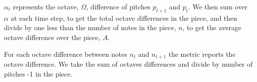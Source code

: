 \documentclass[11pt]{article}
\begin{document}
\indent $\alpha_t$ represents the octave, $\Omega$, difference of pitches $p_{t+1}$ and $p_t$. We then sum over $\alpha$ at each time step, to get the total octave differences in the piece, and then divide by one less than the number of notes in the piece, $n$, to get the average octave difference over the piece, $A$.

For each octave difference between notes $n_t$ and $n_{t+1}$ the metric reports the octave difference. We take the sum of octaves differences and divide by number of pitches -1 in the piece.








\nocite{huang2018music, kotecha2018generating, vaswani2017attention, zhao2020verticalhorizontal}
\end{document}
